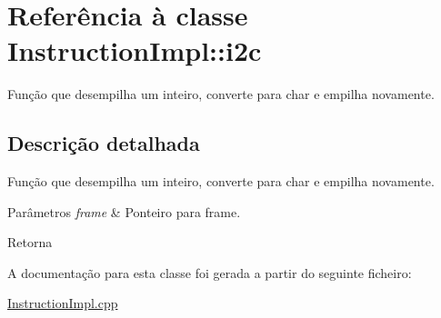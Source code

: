\hypertarget{class_instruction_impl_1_1i2c}{}\section{Referência à classe Instruction\+Impl\+:\+:i2c}
\label{class_instruction_impl_1_1i2c}


Função que desempilha um inteiro, converte para char e empilha novamente.  




\subsection{Descrição detalhada}
Função que desempilha um inteiro, converte para char e empilha novamente. 


\begin{DoxyParams}{Parâmetros}
{\em frame} & Ponteiro para frame. \\
\hline
\end{DoxyParams}
\begin{DoxyReturn}{Retorna}

\end{DoxyReturn}


A documentação para esta classe foi gerada a partir do seguinte ficheiro\+:\begin{DoxyCompactItemize}
\item 
\hyperlink{_instruction_impl_8cpp}{Instruction\+Impl.\+cpp}\end{DoxyCompactItemize}
